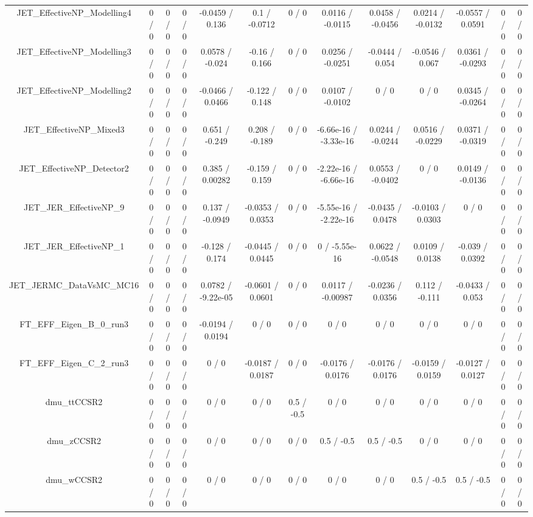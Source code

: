\documentclass[10pt]{article}
\begin{document}
\begin{table}[htbp]
\begin{center}
\begin{tabular}{|c|c|c|c|c|c|c|c|c|c|c|c|c|}
  JET_EffectiveNP_Modelling4 & 0 / 0 & 0 / 0 & 0 / 0 & -0.0459 / 0.136 & 0.1 / -0.0712 & 0 / 0 & 0.0116 / -0.0115 & 0.0458 / -0.0456 & 0.0214 / -0.0132 & -0.0557 / 0.0591 & 0 / 0 & 0 / 0 \\ 
  JET_EffectiveNP_Modelling3 & 0 / 0 & 0 / 0 & 0 / 0 & 0.0578 / -0.024 & -0.16 / 0.166 & 0 / 0 & 0.0256 / -0.0251 & -0.0444 / 0.054 & -0.0546 / 0.067 & 0.0361 / -0.0293 & 0 / 0 & 0 / 0 \\ 
  JET_EffectiveNP_Modelling2 & 0 / 0 & 0 / 0 & 0 / 0 & -0.0466 / 0.0466 & -0.122 / 0.148 & 0 / 0 & 0.0107 / -0.0102 & 0 / 0 & 0 / 0 & 0.0345 / -0.0264 & 0 / 0 & 0 / 0 \\ 
  JET_EffectiveNP_Mixed3 & 0 / 0 & 0 / 0 & 0 / 0 & 0.651 / -0.249 & 0.208 / -0.189 & 0 / 0 & -6.66e-16 / -3.33e-16 & 0.0244 / -0.0244 & 0.0516 / -0.0229 & 0.0371 / -0.0319 & 0 / 0 & 0 / 0 \\ 
  JET_EffectiveNP_Detector2 & 0 / 0 & 0 / 0 & 0 / 0 & 0.385 / 0.00282 & -0.159 / 0.159 & 0 / 0 & -2.22e-16 / -6.66e-16 & 0.0553 / -0.0402 & 0 / 0 & 0.0149 / -0.0136 & 0 / 0 & 0 / 0 \\ 
  JET_JER_EffectiveNP_9 & 0 / 0 & 0 / 0 & 0 / 0 & 0.137 / -0.0949 & -0.0353 / 0.0353 & 0 / 0 & -5.55e-16 / -2.22e-16 & -0.0435 / 0.0478 & -0.0103 / 0.0303 & 0 / 0 & 0 / 0 & 0 / 0 \\ 
  JET_JER_EffectiveNP_1 & 0 / 0 & 0 / 0 & 0 / 0 & -0.128 / 0.174 & -0.0445 / 0.0445 & 0 / 0 & 0 / -5.55e-16 & 0.0622 / -0.0548 & 0.0109 / 0.0138 & -0.039 / 0.0392 & 0 / 0 & 0 / 0 \\ 
  JET_JERMC_DataVsMC_MC16 & 0 / 0 & 0 / 0 & 0 / 0 & 0.0782 / -9.22e-05 & -0.0601 / 0.0601 & 0 / 0 & 0.0117 / -0.00987 & -0.0236 / 0.0356 & 0.112 / -0.111 & -0.0433 / 0.053 & 0 / 0 & 0 / 0 \\ 
  FT_EFF_Eigen_B_0_run3 & 0 / 0 & 0 / 0 & 0 / 0 & -0.0194 / 0.0194 & 0 / 0 & 0 / 0 & 0 / 0 & 0 / 0 & 0 / 0 & 0 / 0 & 0 / 0 & 0 / 0 \\ 
  FT_EFF_Eigen_C_2_run3 & 0 / 0 & 0 / 0 & 0 / 0 & 0 / 0 & -0.0187 / 0.0187 & 0 / 0 & -0.0176 / 0.0176 & -0.0176 / 0.0176 & -0.0159 / 0.0159 & -0.0127 / 0.0127 & 0 / 0 & 0 / 0 \\ 
  dmu_ttCCSR2 & 0 / 0 & 0 / 0 & 0 / 0 & 0 / 0 & 0 / 0 & 0.5 / -0.5 & 0 / 0 & 0 / 0 & 0 / 0 & 0 / 0 & 0 / 0 & 0 / 0 \\ 
  dmu_zCCSR2 & 0 / 0 & 0 / 0 & 0 / 0 & 0 / 0 & 0 / 0 & 0 / 0 & 0.5 / -0.5 & 0.5 / -0.5 & 0 / 0 & 0 / 0 & 0 / 0 & 0 / 0 \\ 
  dmu_wCCSR2 & 0 / 0 & 0 / 0 & 0 / 0 & 0 / 0 & 0 / 0 & 0 / 0 & 0 / 0 & 0 / 0 & 0.5 / -0.5 & 0.5 / -0.5 & 0 / 0 & 0 / 0 \\ 

\end{tabular}
\end{center}
\end{table}
\end{document}
